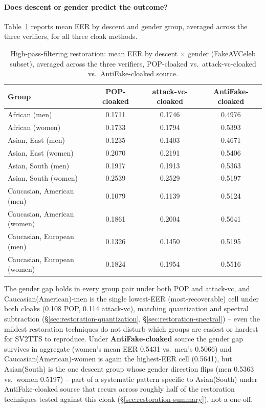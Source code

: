 \documentclass[11pt]{article}
\begin{document}
\paragraph{Does descent or gender predict the outcome?}
Table~\ref{tab:restoration-highpass-demographics} reports mean EER by
descent and gender group, averaged across the three verifiers, for all
three cloak methods.

\begin{table}[H]
\centering
\caption{High-pass-filtering restoration: mean EER by descent $\times$
gender (FakeAVCeleb subset), averaged across the three verifiers,
POP-cloaked vs.\ attack-vc-cloaked vs.\ AntiFake-cloaked source.}
\label{tab:restoration-highpass-demographics}
\begin{tabular}{lccc}
\toprule
Group & POP-cloaked & attack-vc-cloaked & AntiFake-cloaked \\
\midrule
African (men)               & 0.1711 & 0.1746 & 0.4976 \\
African (women)              & 0.1733 & 0.1794 & 0.5393 \\
Asian, East (men)            & 0.1235 & 0.1403 & 0.4671 \\
Asian, East (women)          & 0.2070 & 0.2191 & 0.5406 \\
Asian, South (men)           & 0.1917 & 0.1913 & 0.5363 \\
Asian, South (women)         & 0.2539 & 0.2529 & 0.5197 \\
Caucasian, American (men)    & 0.1079 & 0.1139 & 0.5124 \\
Caucasian, American (women)  & 0.1861 & 0.2004 & 0.5641 \\
Caucasian, European (men)    & 0.1326 & 0.1450 & 0.5195 \\
Caucasian, European (women)  & 0.1824 & 0.1954 & 0.5516 \\
\bottomrule
\end{tabular}
\end{table}

The gender gap holds in every group pair under both POP and attack-vc,
and Caucasian(American)-men is the single lowest-EER (most-recoverable)
cell under both cloaks (0.108 POP, 0.114 attack-vc), matching
quantization and spectral subtraction
(\S\ref{sec:restoration-quantization}, \S\ref{sec:restoration-spectral}) --
even the mildest restoration techniques do not disturb which groups are
easiest or hardest for SV2TTS to reproduce. Under
\textbf{AntiFake-cloaked} source the gender gap survives in aggregate
(women's mean EER 0.5431 vs.\ men's 0.5066) and Caucasian(American)-women
is again the highest-EER cell (0.5641), but Asian(South) is the one
descent group whose gender direction flips (men 0.5363 vs.\ women
0.5197) -- part of a systematic pattern specific to Asian(South) under
AntiFake-cloaked source that recurs across roughly half of the
restoration techniques tested against this cloak
(\S\ref{sec:restoration-summary}), not a one-off.
\end{document}
